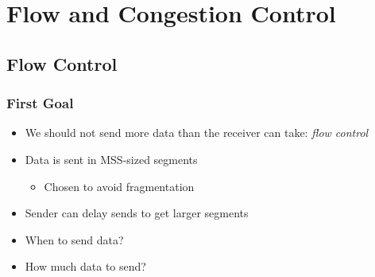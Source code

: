 \chapter{Flow and Congestion Control}
\section{Flow Control}
\subsection{First Goal}
\begin{itemize}[nosep]
    \item We should not send more data than the receiver can take: \emph{flow control}
    \item Data is sent in MSS-sized segments
          \begin{itemize}[nosep]
              \item Chosen to avoid fragmentation
          \end{itemize}
    \item Sender can delay sends to get larger segments
    \item When to send data?
    \item How much data to send?
\end{itemize}
